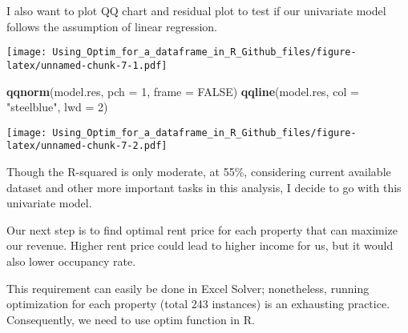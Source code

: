 \documentclass[]{article}
\newenvironment{Shaded}{\begin{snugshade}}{\end{snugshade}}
\newcommand{\DataTypeTok}[1]{\textcolor[rgb]{0.13,0.29,0.53}{#1}}
\newcommand{\DecValTok}[1]{\textcolor[rgb]{0.00,0.00,0.81}{#1}}
\newcommand{\KeywordTok}[1]{\textcolor[rgb]{0.13,0.29,0.53}{\textbf{#1}}}
\newcommand{\NormalTok}[1]{#1}
\newcommand{\OperatorTok}[1]{\textcolor[rgb]{0.81,0.36,0.00}{\textbf{#1}}}
\newcommand{\OtherTok}[1]{\textcolor[rgb]{0.56,0.35,0.01}{#1}}
\newcommand{\StringTok}[1]{\textcolor[rgb]{0.31,0.60,0.02}{#1}}
\begin{document}
I also want to plot QQ chart and residual plot to test if our univariate
model follows the assumption of linear regression.

\begin{Shaded}
\end{Shaded}

\texttt{[image: Using\_Optim\_for\_a\_dataframe\_in\_R\_Github\_files/figure-latex/unnamed-chunk-7-1.pdf]}

\begin{Shaded}
\begin{Highlighting}[]
\KeywordTok{qqnorm}\NormalTok{(model.res, }\DataTypeTok{pch =} \DecValTok{1}\NormalTok{, }\DataTypeTok{frame =} \OtherTok{FALSE}\NormalTok{)}
\KeywordTok{qqline}\NormalTok{(model.res, }\DataTypeTok{col =} \StringTok{"steelblue"}\NormalTok{, }\DataTypeTok{lwd =} \DecValTok{2}\NormalTok{)}
\end{Highlighting}
\end{Shaded}

\texttt{[image: Using\_Optim\_for\_a\_dataframe\_in\_R\_Github\_files/figure-latex/unnamed-chunk-7-2.pdf]}

Though the R-squared is only moderate, at 55\%, considering current
available dataset and other more important tasks in this analysis, I
decide to go with this univariate model.

Our next step is to find optimal rent price for each property that can
maximize our revenue. Higher rent price could lead to higher income for
us, but it would also lower occupancy rate.

This requirement can easily be done in Excel Solver; nonetheless,
running optimization for each property (total 243 instances) is an
exhausting practice. Consequently, we need to use optim function in R.
\end{document}
